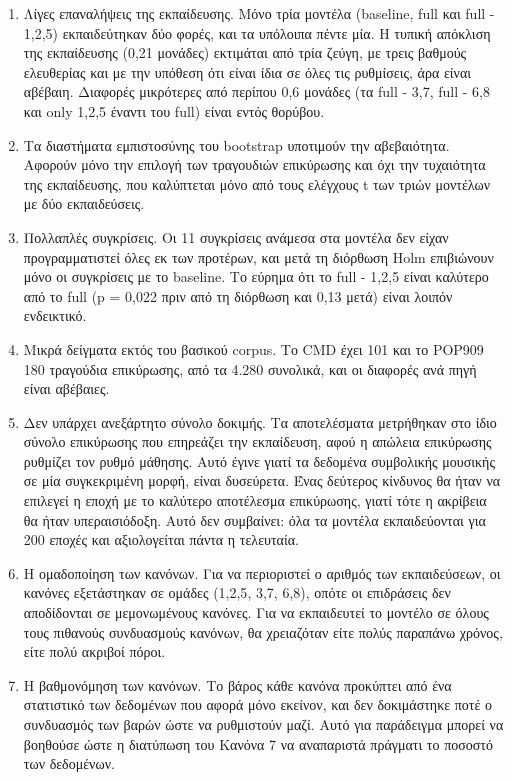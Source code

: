 \begin{enumerate}
    \item Λίγες επαναλήψεις της εκπαίδευσης. Μόνο τρία μοντέλα (baseline, full και full - {1,2,5}) εκπαιδεύτηκαν δύο φορές, και τα υπόλοιπα πέντε μία. Η τυπική απόκλιση της εκπαίδευσης (0,21 μονάδες) εκτιμάται από τρία ζεύγη, με τρεις βαθμούς ελευθερίας και με την υπόθεση ότι είναι ίδια σε όλες τις ρυθμίσεις, άρα είναι αβέβαιη. Διαφορές μικρότερες από περίπου 0,6 μονάδες (τα full - {3,7}, full - {6,8} και only {1,2,5} έναντι του full) είναι εντός θορύβου.
    \item Τα διαστήματα εμπιστοσύνης του bootstrap υποτιμούν την αβεβαιότητα. Αφορούν μόνο την επιλογή των τραγουδιών επικύρωσης και όχι την τυχαιότητα της εκπαίδευσης, που καλύπτεται μόνο από τους ελέγχους t των τριών μοντέλων με δύο εκπαιδεύσεις.
    \item Πολλαπλές συγκρίσεις. Οι 11 συγκρίσεις ανάμεσα στα μοντέλα δεν είχαν προγραμματιστεί όλες εκ των προτέρων, και μετά τη διόρθωση Holm επιβιώνουν μόνο οι συγκρίσεις με το baseline. Το εύρημα ότι το full - {1,2,5} είναι καλύτερο από το full (p = 0,022 πριν από τη διόρθωση και 0,13 μετά) είναι λοιπόν ενδεικτικό.
    \item Μικρά δείγματα εκτός του βασικού corpus. Το CMD έχει 101 και το POP909 180 τραγούδια επικύρωσης, από τα 4.280 συνολικά, και οι διαφορές ανά πηγή είναι αβέβαιες.
    \item Δεν υπάρχει ανεξάρτητο σύνολο δοκιμής. Τα αποτελέσματα μετρήθηκαν στο ίδιο σύνολο επικύρωσης που επηρεάζει την εκπαίδευση, αφού η απώλεια επικύρωσης ρυθμίζει τον ρυθμό μάθησης. Αυτό έγινε γιατί τα δεδομένα συμβολικής μουσικής σε μία συγκεκριμένη μορφή, είναι δυσεύρετα. Ένας δεύτερος κίνδυνος θα ήταν να επιλεγεί η εποχή με το καλύτερο αποτέλεσμα επικύρωσης, γιατί τότε η ακρίβεια θα ήταν υπεραισιόδοξη. Αυτό δεν συμβαίνει: όλα τα μοντέλα εκπαιδεύονται για 200 εποχές και αξιολογείται πάντα η τελευταία.
    \item Η ομαδοποίηση των κανόνων. Για να περιοριστεί ο αριθμός των εκπαιδεύσεων, οι κανόνες εξετάστηκαν σε ομάδες ({1,2,5}, {3,7}, {6,8}), οπότε οι επιδράσεις δεν αποδίδονται σε μεμονωμένους κανόνες. Για να εκπαιδευτεί το μοντέλο σε όλους τους πιθανούς συνδυασμούς κανόνων, θα χρειαζόταν είτε πολύς παραπάνω χρόνος, είτε πολύ ακριβοί πόροι.
    \item Η βαθμονόμηση των κανόνων. Το βάρος κάθε κανόνα προκύπτει από ένα στατιστικό των δεδομένων που αφορά μόνο εκείνον, και δεν δοκιμάστηκε ποτέ ο συνδυασμός των βαρών ώστε να ρυθμιστούν μαζί. Αυτό για παράδειγμα μπορεί να βοηθούσε ώστε η διατύπωση του Κανόνα 7 να αναπαριστά πράγματι το ποσοστό των δεδομένων.

\end{enumerate}

